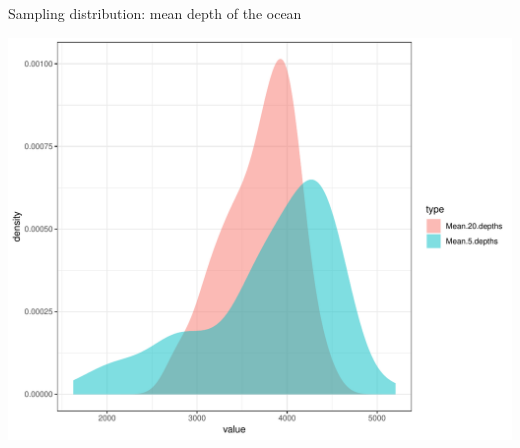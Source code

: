 \documentclass[handout]{beamer}\usepackage[]{graphicx}\usepackage[]{color}
\newenvironment{knitrout}{}{} %
\begin{document}
\begin{frame}[fragile]{Sampling distribution: mean depth of the ocean}


\begin{knitrout}\scriptsize
{}\color{fgcolor}

{\centering \includegraphics[width=1\linewidth]{figure/unnamed-chunk-6-1} 

}



\end{knitrout}

\end{frame}















\end{document}

